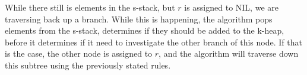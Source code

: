 While there still is elements in the s-stack, but $r$ is assigned to NIL, we are traversing back up a branch. While this is happening, the algorithm pops elements from the s-stack, determines if they should be added to the k-heap, before it determines if it need to investigate the other branch of this node. If that is the case, the other node is assigned to $r$, and the algorithm will traverse down this subtree using the previously stated rules.









